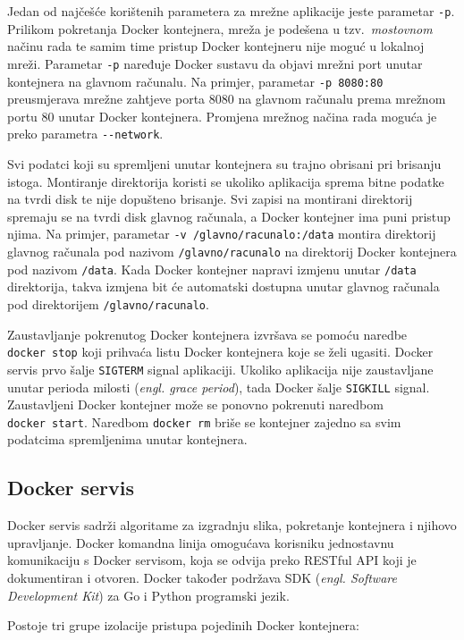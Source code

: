 Jedan od najčešće korištenih parametera za mrežne aplikacije jeste parametar \texttt{-p}. Prilikom
pokretanja Docker kontejnera, mreža je podešena u tzv.~\textit{mostovnom} načinu rada te samim time
pristup Docker kontejneru nije moguć u lokalnoj mreži. Parametar \texttt{-p} naređuje Docker sustavu
da objavi mrežni port unutar kontejnera na glavnom računalu. Na primjer, parametar \texttt{-p
8080:80} preusmjerava mrežne zahtjeve porta 8080 na glavnom računalu prema mrežnom portu 80 unutar
Docker kontejnera. Promjena mrežnog načina rada moguća je preko parametra \texttt{-{}-network}.

Svi podatci koji su spremljeni unutar kontejnera su trajno obrisani pri brisanju istoga. Montiranje
direktorija koristi se ukoliko aplikacija sprema bitne podatke na tvrdi disk te nije dopušteno
brisanje. Svi zapisi na montirani direktorij spremaju se na tvrdi disk glavnog računala, a Docker
kontejner ima puni pristup njima. Na primjer, parametar \texttt{-v /glavno/racunalo:/data} montira
direktorij glavnog računala pod nazivom \texttt{/glavno/racunalo} na direktorij Docker kontejnera
pod nazivom \texttt{/data}. Kada Docker kontejner napravi izmjenu unutar \texttt{/data} direktorija,
takva izmjena bit će automatski dostupna unutar glavnog računala pod direktorijem
\texttt{/glavno/racunalo}.

Zaustavljanje pokrenutog Docker kontejnera izvršava se pomoću naredbe \texttt{docker~stop} koji
prihvaća listu Docker kontejnera koje se želi ugasiti. Docker servis prvo šalje \texttt{SIGTERM}
signal aplikaciji. Ukoliko aplikacija nije zaustavljane unutar perioda milosti (\textit{engl. grace
period}), tada Docker šalje \texttt{SIGKILL} signal.  Zaustavljeni Docker kontejner može se ponovno
pokrenuti naredbom \texttt{docker~start}. Naredbom \texttt{docker~rm} briše se kontejner zajedno sa
svim podatcima spremljenima unutar kontejnera.

\subsection{Docker servis}
Docker servis sadrži algoritame za izgradnju slika, pokretanje kontejnera i njihovo upravljanje.
Docker komandna linija omogućava korisniku jednostavnu komunikaciju s Docker servisom, koja se
odvija preko RESTful API koji je dokumentiran i otvoren. Docker također podržava SDK (\textit{engl.
Software Development Kit}) za Go i Python programski jezik.

Postoje tri grupe izolacije pristupa pojedinih Docker kontejnera:

